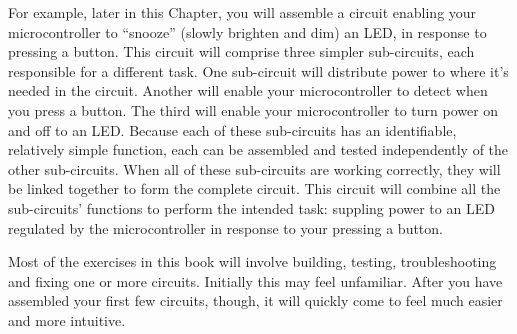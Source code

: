 For example, later in this Chapter, you will assemble a circuit enabling your microcontroller to ``snooze'' (slowly brighten and dim) an LED, in response to pressing a button. 
This circuit will comprise three  simpler sub-circuits, each responsible for a different task. 
One sub-circuit will distribute power to where it's needed in the circuit. 
Another will enable your microcontroller to detect when you press a button. 
The third will enable your microcontroller to turn power on and off to an LED. 
Because each of these sub-circuits has an identifiable, relatively simple function, each can be assembled and tested independently of the other sub-circuits. 
When all of these sub-circuits are working correctly, they will be linked together to form the complete circuit. 
This circuit will combine all the sub-circuits' functions to perform the intended task: suppling power to an LED regulated by the microcontroller in response to your pressing a button. 

Most of the exercises in this book will involve building, testing, troubleshooting and fixing one or more circuits. 
Initially this may feel unfamiliar.
After you have assembled your first few circuits, though, it will quickly come to feel much easier and more intuitive.

